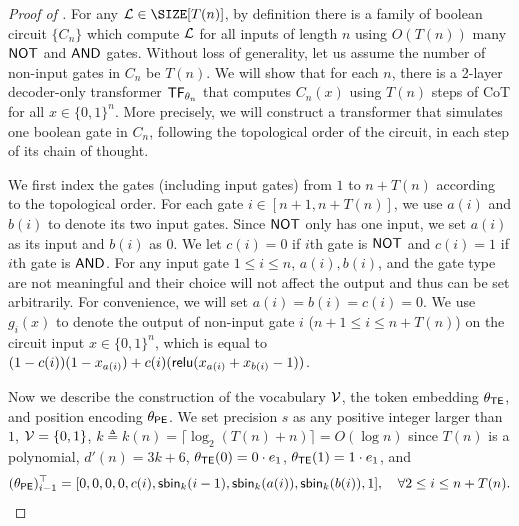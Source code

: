 \begin{proof}[Proof of ]
	For any $\gL\in \SIZE[T(n)]$, by definition there is a family of boolean circuit $\{C_n\}$ which compute ${\mathcal{L}}$ for all inputs of length $n$ using $O(T(n))$ many   $\mathsf{NOT}$ and $\mathsf{AND}$ gates. Without loss of generality, let us assume the number of non-input gates in $C_n$ be $T(n)$. We will show that for each $n$, there is a 2-layer decoder-only transformer $\mathsf{TF}_{\theta_n}$ that computes $C_n(x)$ using $T(n)$ steps of CoT for all $x\in\{0,1\}^n$. More precisely, we will construct a transformer that simulates one boolean gate in $C_n$, following the topological order of the circuit, in each step of its chain of thought. 
	
	We first index the gates (including input gates) from $1$ to $n+T(n)$ according to the topological order. For each gate $i \in [n+1,n+T(n)]$, we use $a(i)$ and $b(i)$ to denote its two input gates. Since $\mathsf{NOT}$ only has one input, we set $a(i)$ as its input and $b(i)$ as $0$.  We let $c(i)=0$ if $i$th gate is $\mathsf{NOT}$ and  $c(i)=1$ if $i$th gate is $\mathsf{AND}$. For any input gate $1\le i\le n$,  $a(i),b(i)$, and the gate type are not meaningful and their choice will not affect the output and thus can be set arbitrarily. For convenience, we will set $a(i)=b(i)=c(i)=0$.  We use $g_i(x)$ to denote the output of non-input gate $i$ ($n+1\le i\le n+T(n)$) on the circuit input $x\in\{0,1\}^n$, which is equal to $(1-c(i))(1-x_{a(i)}) + c(i)(\mathsf{relu}(x_{a(i)} + x_{b(i)}-1))$.
	
	Now we describe the construction of the vocabulary ${\mathcal{V}}$, the token embedding $\theta_{\mathsf{TE}}$,  and position encoding $\theta_{\mathsf{PE}}$. We set precision $s$ as any positive integer larger than $1$, ${\mathcal{V}}=\{0,1\}$, $k\triangleq k(n) = \lceil \log_2 (T(n)+n) \rceil = O(\log n)$ since $T(n)$ is a polynomial, $d'(n) = 3k+6$, $\theta_{\mathsf{TE}}(0) = 0\cdot e_1$,  $\theta_{\mathsf{TE}}(1) =  1\cdot e_1$, and 
	\begin{align}
	(\theta_{\mathsf{PE}})_{i-1}^\top = [0,0,0,0, c(i), \mathsf{sbin}_k(i-1) , \mathsf{sbin}_k(a(i)), \mathsf{sbin}_k(b(i)),1], \quad  \forall 2\le i \le n+T(n).	
	\end{align}
	

\end{proof}
